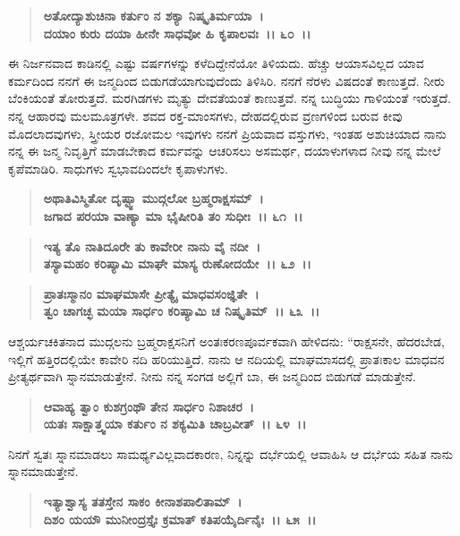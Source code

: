 \begin{verse}
\textbf{ಅತೋದ್ಯಾಶುಚಿನಾ ಕರ್ತುಂ ನ ಶಕ್ಯಾ ನಿಷ್ಕೃತಿರ್ಮಯಾ~।}\\\textbf{ದಯಾಂ ಕುರು ದಯಾ ಹೀನೇ ಸಾಧವೋ ಹಿ ಕೃಪಾಲವಃ~।। ೬೦~।।}
\end{verse}

ಈ ನಿರ್ಜನವಾದ ಕಾಡಿನಲ್ಲಿ ಎಷ್ಟು ವರ್ಷಗಳನ್ನು ಕಳೆದಿದ್ದೇನೆಯೋ ತಿಳಿಯದು. ಹೆಚ್ಚು ಆಯಾಸವಿಲ್ಲದ ಯಾವ ಕರ್ಮದಿಂದ ನನಗೆ ಈ ಜನ್ಮದಿಂದ ಬಿಡುಗಡೆಯಾಗುವುದೆಂದು ತಿಳಿಸಿರಿ. ನನಗೆ ನೆರಳು ವಿಷದಂತೆ ಕಾಣುತ್ತದೆ. ನೀರು ಬೆಂಕಿಯಂತೆ ತೋರುತ್ತದೆ. ಮರಗಿಡಗಳು ಮೃತ್ಯು ದೇವತೆಯಂತೆ ಕಾಣುತ್ತವೆ. ನನ್ನ ಬುದ್ಧಿಯು ಗಾಳಿಯಂತೆ ಇರುತ್ತದೆ. ನನ್ನ ಆಹಾರವು ಮಲಮೂತ್ರಗಳೇ. ಶವದ ರಕ್ತ-ಮಾಂಸಗಳು, ದೇಹದಲ್ಲಿರುವ ವ್ರಣಗಳಿಂದ ಬರುವ ಕೀವು ಮೊದಲಾದವುಗಳು, ಸ್ತ್ರೀಯರ ರಜೋಮಲ ಇವುಗಳು ನನಗೆ ಪ್ರಿಯವಾದ ವಸ್ತುಗಳು, ಇಂತಹ ಅಶುಚಿಯಾದ ನಾನು ನನ್ನ ಈ ಜನ್ಮ ನಿವೃತ್ತಿಗೆ ಮಾಡಬೇಕಾದ ಕರ್ಮವನ್ನು ಆಚರಿಸಲು ಅಸಮರ್ಥ, ದಯಾಳುಗಳಾದ ನೀವು ನನ್ನ ಮೇಲೆ ಕೃಪೆಮಾಡಿರಿ. ಸಾಧುಗಳು ಸ್ವಭಾವದಿಂದಲೇ ಕೃಪಾಳುಗಳು.

\begin{verse}
\textbf{ಅಥಾತಿವಿಸ್ಮಿತೋ ದೃಷ್ಟ್ವಾ ಮುದ್ಗಲೋ ಬ್ರಹ್ಮರಾಕ್ಷಸಮ್~।}\\\textbf{ಜಗಾದ ಪರಯಾ ವಾಣ್ಯಾ ಮಾ ಭೈಷೀರಿತಿ ತಂ ಸುಧೀಃ~।। ೬೧~।।} 
\end{verse}

\begin{verse}
\textbf{ಇತ್ಯ ತೊ ನಾತಿದೂರೇ ತು ಕಾವೇರೀ ನಾನು ವೈ ನದೀ~।}\\\textbf{ತಸ್ಯಾಮಹಂ ಕರಿಷ್ಯಾಮಿ ಮಾಘೇ ಮಾಸ್ಯ ರುಣೋದಯೇ~।। ೬೨~।। }
\end{verse}

\begin{verse}
\textbf{ಪ್ರಾತಃಸ್ಮಾನಂ ಮಾಘಮಾಸೇ ಪ್ರೀತ್ಯೈ ಮಾಧವಸಂಜ್ಞಿತೇ~।}\\\textbf{ತ್ವಂ ಚಾಗಚ್ಛ ಮಯಾ ಸಾರ್ಧಂ ಕರಿಷ್ಯಾಮಿ ಚ ನಿಷ್ಕೃತಿಮ್~।। ೬೩~।।}
\end{verse}

ಆಶ್ಚರ್ಯಚಕಿತನಾದ ಮುದ್ಗಲನು ಬ್ರಹ್ಮರಾಕ್ಷಸನಿಗೆ ಅಂತಃಕರಣಪೂರ್ವಕವಾಗಿ ಹೇಳಿದನು: “ರಾಕ್ಷಸನೇ, ಹೆದರಬೇಡ, ಇಲ್ಲಿಗೆ ಹತ್ತಿರದಲ್ಲಿಯೇ ಕಾವೇರಿ ನದಿ ಹರಿಯುತ್ತಿದೆ. ನಾನು ಆ ನದಿಯಲ್ಲಿ ಮಾಘಮಾಸದಲ್ಲಿ ಪ್ರಾತಃಕಾಲ ಮಾಧವನ ಪ್ರೀತ್ಯರ್ಥವಾಗಿ ಸ್ನಾನಮಾಡುತ್ತೇನೆ. ನೀನು ನನ್ನ ಸಂಗಡ ಅಲ್ಲಿಗೆ ಬಾ, ಈ ಜನ್ಮದಿಂದ ಬಿಡುಗಡೆ ಮಾಡುತ್ತೇನೆ.

\begin{verse}
\textbf{ಆವಾಹ್ಯ ತ್ವಾಂ ಕುಶಗ್ರಂಥೌ ತೇನ ಸಾರ್ಧಂ ನಿಶಾಚರ~।}\\\textbf{ಯತಃ ಸಾಕ್ಷಾತ್ತ್ವಯಾ ಕರ್ತುಂ ನ ಶಕ್ಯಮಿತಿ ಚಾಬ್ರವೀತ್~।। ೬೪~।।}
\end{verse}

ನಿನಗೆ ಸ್ವತಃ ಸ್ನಾನಮಾಡಲು ಸಾಮರ್ಥ್ಯವಿಲ್ಲವಾದಕಾರಣ, ನಿನ್ನನ್ನು ದರ್ಭೆಯಲ್ಲಿ ಆವಾಹಿಸಿ ಆ ದರ್ಭೆಯ ಸಹಿತ ನಾನು ಸ್ನಾನಮಾಡುತ್ತೇನೆ.

\begin{verse}
\textbf{ಇತ್ಯಾಶ್ವಾಸ್ಯ ತತಸ್ತೇನ ಸಾಕಂ ಕೀನಾಶಪಾಲಿತಾಮ್~।}\\\textbf{ದಿಶಂ ಯಯೌ ಮುನೀಂದ್ರಸ್ತೈಃ ಕ್ರಮಾತ್ ಕತಿಪಯೈರ್ದಿನೈಃ~।। ೬೫~।। }
\end{verse}

